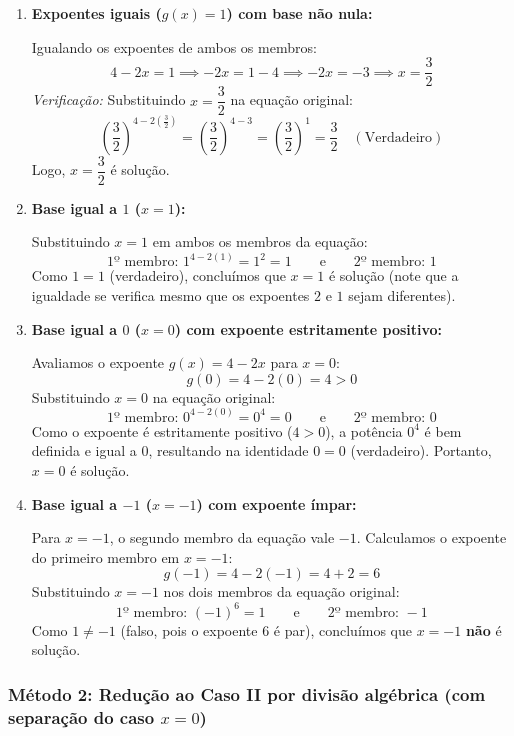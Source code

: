 \documentclass[12pt,a4paper]{report}
\begin{document}
	\begin{enumerate}[label=\textbf{\arabic*ª Possibilidade:}, leftmargin=*]
		\item \textbf{Expoentes iguais ($g(x) = 1$) com base não nula:}
		
		Igualando os expoentes de ambos os membros:
		\[
		4 - 2x = 1 \implies -2x = 1 - 4 \implies -2x = -3 \implies x = \frac{3}{2}
		\]
		\textit{Verificação:} Substituindo $x = \dfrac{3}{2}$ na equação original:
		\[
		\left(\frac{3}{2}\right)^{4 - 2\left(\frac{3}{2}\right)} = \left(\frac{3}{2}\right)^{4 - 3} = \left(\frac{3}{2}\right)^1 = \frac{3}{2} \quad (\text{Verdadeiro})
		\]
		Logo, $x = \dfrac{3}{2}$ é solução.
		
		\item \textbf{Base igual a $1$ ($x = 1$):}
		
		Substituindo $x = 1$ em ambos os membros da equação:
		\[
		\text{1º membro: } 1^{4 - 2(1)} = 1^2 = 1 \qquad \text{e} \qquad \text{2º membro: } 1
		\]
		Como $1 = 1$ (verdadeiro), concluímos que $x = 1$ é solução (note que a igualdade se verifica mesmo que os expoentes $2$ e $1$ sejam diferentes).
		
		\item \textbf{Base igual a $0$ ($x = 0$) com expoente estritamente positivo:}
		
		Avaliamos o expoente $g(x) = 4 - 2x$ para $x = 0$:
		\[
		g(0) = 4 - 2(0) = 4 > 0
		\]
		Substituindo $x = 0$ na equação original:
		\[
		\text{1º membro: } 0^{4 - 2(0)} = 0^4 = 0 \qquad \text{e} \qquad \text{2º membro: } 0
		\]
		Como o expoente é estritamente positivo ($4 > 0$), a potência $0^4$ é bem definida e igual a $0$, resultando na identidade $0 = 0$ (verdadeiro). Portanto, $x = 0$ é solução.
		
		\item \textbf{Base igual a $-1$ ($x = -1$) com expoente ímpar:}
		
		Para $x = -1$, o segundo membro da equação vale $-1$. Calculamos o expoente do primeiro membro em $x = -1$:
		\[
		g(-1) = 4 - 2(-1) = 4 + 2 = 6
		\]
		Substituindo $x = -1$ nos dois membros da equação original:
		\[
		\text{1º membro: } (-1)^6 = 1 \qquad \text{e} \qquad \text{2º membro: } -1
		\]
		Como $1 \neq -1$ (falso, pois o expoente $6$ é par), concluímos que $x = -1$ \textbf{não} é solução.
	\end{enumerate}
	
	\subsubsection*{Método 2: Redução ao Caso II por divisão algébrica (com separação do caso $x = 0$)}
	
\end{document}
